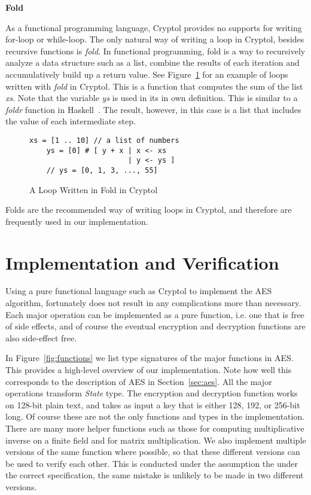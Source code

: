 \documentclass[a4paper, notitlepage]{report}
\renewcommand{\paragraph}[1]{\vspace*{1em}\noindent\textbf{#1}\hspace*{1em}}
\begin{document}
\paragraph{Fold}

As a functional programming language, Cryptol provides no supports for writing
for-loop or
while-loop. The only natural way of writing a loop in Cryptol, besides recursive
functions is \emph{fold}.
In functional programming, fold is a way to recursively analyze a data structure
such as a list, combine the results of each iteration and accumulatively build up
a return value.
See Figure~\ref{fig:fold} for an example of loops written with \emph{fold} in
Cryptol.
This is a function that computes the sum of the list \emph{xs}.
Note that the variable \emph{ys} is used in its in own definition.
This is similar to a \emph{foldr} function in Haskell~\cite{lipovaca2011learn}.
The result, however, in this case is a list that includes the value of each
intermediate step.

\begin{figure}
  \begin{lstlisting}[frame=single]
    xs = [1 .. 10] // a list of numbers
    ys = [0] # [ y + x | x <- xs 
                       | y <- ys ]
    // ys = [0, 1, 3, ..., 55]
  \end{lstlisting}
  \caption{A Loop Written in Fold in Cryptol}
  \label{fig:fold}
\end{figure}

Folds are the recommended way of writing loops in Cryptol, and therefore are
frequently used in our implementation.


\section{Implementation and Verification}
\label{sec:correct}

Using a pure functional language such as Cryptol to implement the AES algorithm,
fortunately does not result in any complications more than necessary. Each major
operation can be implemented as a pure function, i.e. one that is free of side
effects, and of course the eventual encryption and decryption functions are also
side-effect free.

In Figure~\ref{fig:functions} we list type signatures of the major functions
in AES. This provides a high-level overview of our implementation. Note how
well this corresponds to the description of AES in Section~\ref{sec:aes}.
All the major operations transform \emph{State} type. The encryption and decryption
function works on 128-bit plain text, and takes as input a key that is either
128, 192, or 256-bit long. Of course these are not the only functions and types in
the implementation. There are many more helper functions such as those for computing
multiplicative inverse on a finite field and for matrix multiplication.
We also implement multiple versions of the same function where possible, so that
these different versions can be used to verify each other. This is conducted
under the assumption the under the correct specification, the same mistake is
unlikely to be made in two different versions.
\end{document}
